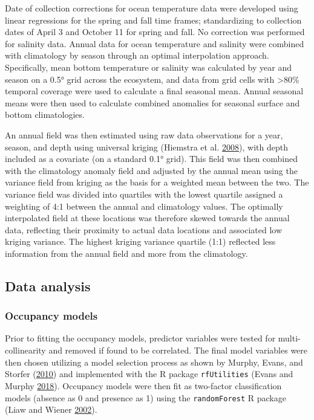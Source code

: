\documentclass[
]{book}
\begin{document}
Date of collection corrections for ocean temperature data were developed using linear regressions for the spring and fall time frames; standardizing to collection dates of April 3 and October 11 for spring and fall. No correction was performed for salinity data. Annual data for ocean temperature and salinity were combined with climatology by season through an optimal interpolation approach. Specifically, mean bottom temperature or salinity was calculated by year and season on a 0.5° grid across the ecosystem, and data from grid cells with \textgreater80\% temporal coverage were used to calculate a final seasonal mean. Annual seasonal means were then used to calculate combined anomalies for seasonal surface and bottom climatologies.

An annual field was then estimated using raw data observations for a year, season, and depth using universal kriging (Hiemstra et al. \protect\hyperlink{ref-automap}{2008}), with depth included as a covariate (on a standard 0.1° grid). This field was then combined with the climatology anomaly field and adjusted by the annual mean using the variance field from kriging as the basis for a weighted mean between the two. The variance field was divided into quartiles with the lowest quartile assigned a weighting of 4:1 between the annual and climatology values. The optimally interpolated field at these locations was therefore skewed towards the annual data, reflecting their proximity to actual data locations and associated low kriging variance. The highest kriging variance quartile (1:1) reflected less information from the annual field and more from the climatology.

\hypertarget{data-analysis-25}{%
\subsection{Data analysis}\label{data-analysis-25}}

\hypertarget{occupancy-models}{%
\subsubsection{Occupancy models}\label{occupancy-models}}

Prior to fitting the occupancy models, predictor variables were tested for multi-collinearity and removed if found to be correlated. The final model variables were then chosen utilizing a model selection process as shown by Murphy, Evans, and Storfer (\protect\hyperlink{ref-Murphy2010}{2010}) and implemented with the R package \texttt{rfUtilities} (Evans and Murphy \protect\hyperlink{ref-rfUtilities-package}{2018}). Occupancy models were then fit as two-factor classification models (absence as 0 and presence as 1) using the \texttt{randomForest} R package (Liaw and Wiener \protect\hyperlink{ref-randomForest}{2002}).
\end{document}
